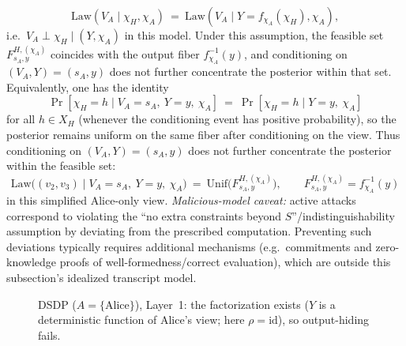 \documentclass[11pt,a4paper]{article}
\theoremstyle{definition}
\theoremstyle{plain}
\newcommand{\Z}{\mathbb{Z}}
\begin{document}
\begin{description}
    \[
    \mathrm{Law}(V_A\mid \chi_H,\chi_A)\ =\ \mathrm{Law}(V_A\mid Y=f_{\chi_A}(\chi_H),\chi_A),
    \]
    i.e.\ $V_A\perp \chi_H\mid (Y,\chi_A)$ in this model.
    Under this assumption, the feasible set $F^{H,(\chi_A)}_{s_A,y}$ coincides with the output fiber $f_{\chi_A}^{-1}(y)$, and conditioning on $(V_A,Y)=(s_A,y)$ does not further concentrate the posterior within that set.
    Equivalently, one has the identity
    \[
    \Pr[\chi_H=h \mid V_A=s_A,\ Y=y,\ \chi_A]\ =\ \Pr[\chi_H=h\mid Y=y,\ \chi_A]
    \]
    for all $h\in X_H$ (whenever the conditioning event has positive probability), so the posterior remains uniform on the same fiber after conditioning on the view.
    Thus conditioning on $(V_A,Y)=(s_A,y)$ does not further concentrate the posterior within the feasible set:
    \[
    \mathrm{Law}\bigl((v_2,v_3)\mid V_A=s_A,\ Y=y,\ \chi_A\bigr)\ =\ \mathrm{Unif}\!\bigl(F^{H,(\chi_A)}_{s_A,y}\bigr),
    \qquad F^{H,(\chi_A)}_{s_A,y}=f_{\chi_A}^{-1}(y)
    \]
    in this simplified Alice-only view.
    \emph{Malicious-model caveat:} active attacks correspond to violating the ``no extra constraints beyond $S$''/indistinguishability assumption by deviating from the prescribed computation.
    Preventing such deviations typically requires additional mechanisms (e.g.\ commitments and zero-knowledge proofs of well-formedness/correct evaluation), which are outside this subsection's idealized transcript model.

    \begin{figure}[ht]
    \centering
    \caption{DSDP ($A=\{\mathrm{Alice}\}$), Layer~1: the factorization exists ($Y$ is a deterministic function of Alice's view; here $\rho=\mathrm{id}$), so output-hiding fails.}
    \label{fig:dsdp-alice-layer1}
    \end{figure}


\end{description}
\end{document}
